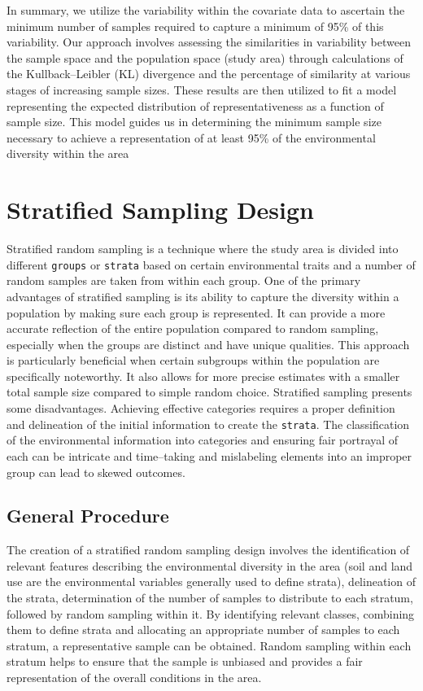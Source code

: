 \documentclass[
  10pt,
  b5paper,
  oneside]{book}
\begin{document}
In summary, we utilize the variability within the covariate data to ascertain the minimum number of samples required to capture a minimum of 95\% of this variability. Our approach involves assessing the similarities in variability between the sample space and the population space (study area) through calculations of the Kullback--Leibler (KL) divergence and the percentage of similarity at various stages of increasing sample sizes. These results are then utilized to fit a model representing the expected distribution of representativeness as a function of sample size. This model guides us in determining the minimum sample size necessary to achieve a representation of at least 95\% of the environmental diversity within the area

\hypertarget{stratified-sampling-design}{%
\chapter{Stratified Sampling Design}\label{stratified-sampling-design}}

Stratified random sampling is a technique where the study area is divided into different \texttt{groups} or \texttt{strata} based on certain environmental traits and a number of random samples are taken from within each group. One of the primary advantages of stratified sampling is its ability to capture the diversity within a population by making sure each group is represented. It can provide a more accurate reflection of the entire population compared to random sampling, especially when the groups are distinct and have unique qualities. This approach is particularly beneficial when certain subgroups within the population are specifically noteworthy. It also allows for more precise estimates with a smaller total sample size compared to simple random choice. Stratified sampling presents some disadvantages. Achieving effective categories requires a proper definition and delineation of the initial information to create the \texttt{strata}. The classification of the environmental information into categories and ensuring fair portrayal of each can be intricate and time--taking and mislabeling elements into an improper group can lead to skewed outcomes.

\hypertarget{general-procedure}{%
\section{General Procedure}\label{general-procedure}}

The creation of a stratified random sampling design involves the identification of relevant features describing the environmental diversity in the area (soil and land use are the environmental variables generally used to define strata), delineation of the strata, determination of the number of samples to distribute to each stratum, followed by random sampling within it. By identifying relevant classes, combining them to define strata and allocating an appropriate number of samples to each stratum, a representative sample can be obtained. Random sampling within each stratum helps to ensure that the sample is unbiased and provides a fair representation of the overall conditions in the area.
\end{document}
